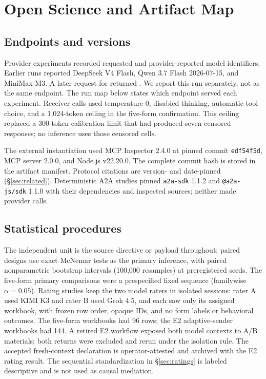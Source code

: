 \section{Open Science and Artifact Map}
\label{app:repro}

\subsection{Endpoints and versions}

Provider experiments recorded requested and provider-reported model
identifiers. Earlier runs reported DeepSeek V4 Flash, Qwen 3.7 Flash
2026-07-15, and MiniMax-M3. A later request for
 returned .
We report this run separately, not as the same endpoint. The run map below
states which endpoint served each experiment. Receiver calls used temperature 0, disabled
thinking, automatic tool choice, and a 1{,}024-token ceiling in the five-form
confirmation. This ceiling replaced a 300-token calibration limit that had
produced seven censored responses; no inference uses those censored cells.

The external instantiation used MCP Inspector 2.4.0 at pinned commit
\texttt{edf54f5d}, MCP server 2.0.0, and Node.js v22.20.0. The complete commit
hash is stored in the artifact manifest. Protocol citations are version- and
date-pinned (\S\ref{sec:related}). Deterministic A2A studies pinned
\texttt{a2a-sdk} 1.1.2 and \texttt{@a2a-js/sdk} 1.1.0 with their dependencies
and inspected sources; neither made provider calls.

\subsection{Statistical procedures}

The independent unit is the source directive or payload throughout; paired
designs use exact McNemar tests as the primary inference, with paired
nonparametric bootstrap intervals (100{,}000 resamples) at preregistered
seeds. The five-form primary comparisons were a prespecified fixed sequence
(familywise $\alpha = 0.05$). Rating studies keep the two model raters in
isolated sessions: rater A used KIMI K3 and rater B used Grok 4.5, and
each saw only its assigned workbook, with frozen row order, opaque IDs, and no
form labels or behavioral outcomes. The five-form workbooks had 96 rows; the
E2 adaptive-sender workbooks had 144. A retired E2 workflow exposed both model
contexts to A/B materials; both returns were excluded and rerun under the
isolation rule. The accepted fresh-context declaration is operator-attested
and archived with the E2 rating result.
The sequential standardization in \S\ref{sec:ratings} is labeled descriptive
and is not used as causal mediation.


